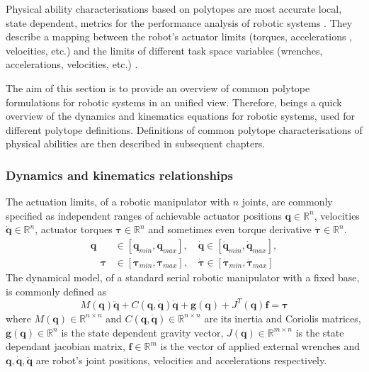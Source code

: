 Physical ability characterisations based on polytopes are most accurate local, state dependent, metrics for the performance analysis of robotic systems \cite{pholsiri2005real,Finotello1998}. They describe a mapping between the robot's actuator limits (torques, accelerations , velocities, etc.) and the limits of different task space variables (wrenches, accelerations, velocities, etc.) . 

The aim of this section is to provide an overview of common polytope formulations for robotic systems in an unified view.  Therefore,  beings a quick overview of the dynamics and kinematics equations for robotic systems, used for different polytope definitions. Definitions 
of common polytope characterisations of physical abilities are then described in subsequent chapters.

\subsubsection{Dynamics and kinematics relationships}
\label{ch:robot_dyn_kin}
The actuation limits, of a robotic manipulator with $n$ joints, are commonly specified as independent ranges of achievable actuator positions $\bm{q}\in \mathbb{R}^n$, velocities $\dot{\bm{q}}\in \mathbb{R}^n$, actuator torques $\bm{\tau}\in \mathbb{R}^n$ and sometimes even torque derivative $\dot{\bm{\tau}}\in \mathbb{R}^n$.
\begin{subequations}
\begin{align}
\bm{q} &\in [ {\bm{q}}_{min}, {\bm{q}}_{max}], \quad\dot{\bm{q}} \in [\dot{\bm{q}}_{min},  \dot{\bm{q}}_{max}], \\
\quad\bm{\tau} &\in [\bm{\tau}_{min},  \bm{\tau}_{max}],
\quad\dot{\bm{\tau}} \in [\dot{\bm{\tau}}_{min},  \dot{\bm{\tau}}_{max}] \label{eq:dyn_limits:torque}
\end{align}
\label{eq:dyn_limits}
\end{subequations}
The dynamical model, of a standard serial robotic manipulator with a fixed base, is commonly defined as
\begin{equation}
M(\bm{q})\ddot{\bm{q}} + C(\bm{q},\dot{\bm{q}})\dot{\bm{q}} + \bm{g}(\bm{q}) + J^T(\bm{q})\bm{f} = \bm{\tau} 
\label{eq:dyn_model_rob}
\end{equation}
where $M(\bm{q}) \in \mathbb{R}^{n \times n}$ and $C(\bm{q},\dot{\bm{q}})\in \mathbb{R}^{n \times n}$ are its inertia and Coriolis matrices, $\bm{g} (\bm{q})\in \mathbb{R}^n$ is the state dependent gravity vector, $J(\bm{q}) \in \mathbb{R}^{m\times n}$ is the state dependant jacobian matrix, $\bm{f}\in \mathbb{R}^m $ is the vector of applied external wrenches and $\bm{q},\dot{\bm{q}},\ddot{\bm{q}}$ are robot's joint positions, velocities and accelerations respectively.

